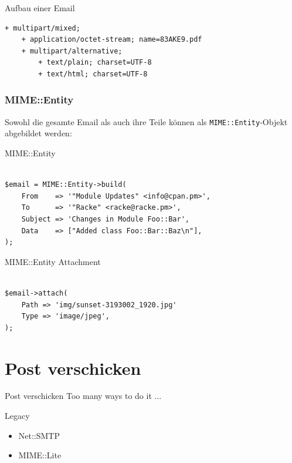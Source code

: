 \begin{frame}[fragile]{Aufbau einer Email}
\begin{lstlisting}
+ multipart/mixed;
    + application/octet-stream; name=83AKE9.pdf
    + multipart/alternative;
        + text/plain; charset=UTF-8
        + text/html; charset=UTF-8
\end{lstlisting}
\end{frame}

\subsubsection{MIME::Entity}

Sowohl die gesamte Email als auch ihre Teile können als
\verb|MIME::Entity|-Objekt abgebildet werden:

\begin{frame}[fragile]{MIME::Entity}
  \begin{verbatim}

$email = MIME::Entity->build(
    From    => '"Module Updates" <info@cpan.pm>',
    To      => '"Racke" <racke@racke.pm>',
    Subject => 'Changes in Module Foo::Bar',
    Data    => ["Added class Foo::Bar::Baz\n"],
);
  \end{verbatim}
\end{frame}

\begin{frame}[fragile]{MIME::Entity Attachment}
  \begin{verbatim}

$email->attach(
    Path => 'img/sunset-3193002_1920.jpg'
    Type => 'image/jpeg',
);

  \end{verbatim}
\end{frame}

\section{Post verschicken}

\begin{frame}{Post verschicken}
  Too many ways to do it ...
\end{frame}

\begin{frame}{Legacy}
  \begin{itemize}
    \item Net::SMTP
    \item MIME::Lite
  \end{itemize}
\end{frame}

